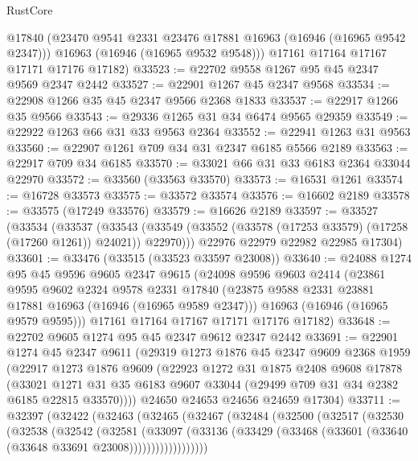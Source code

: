 \begin{lexlean}{RustCore}
\begin{coremodule}
        @17840
        (@23470 @9541 @2331 @23476 @17881 @16963 (@16946 (@16965 @9542 @2347)))
        @16963
        (@16946 (@16965 @9532 @9548)))
      @17161
      @17164
      @17167
      @17171
      @17176
      @17182)
@33523 := @22702 @9558 @1267 @95 @45 @2347 @9569 @2347 @2442
@33527 := @22901 @1267 @45 @2347 @9568
@33534 := @22908 @1266 @35 @45 @2347 @9566 @2368 @1833
@33537 := @22917 @1266 @35 @9566
@33543 := @29336 @1265 @31 @34 @6474 @9565 @29359
@33549 := @22922 @1263 @66 @31 @33 @9563 @2364
@33552 := @22941 @1263 @31 @9563
@33560 := @22907 @1261 @709 @34 @31 @2347 @6185 @5566 @2189
@33563 := @22917 @709 @34 @6185
@33570 := @33021 @66 @31 @33 @6183 @2364 @33044 @22970
@33572 := @33560 (@33563 @33570)
@33573 := @16531 @1261
@33574 := @16728 @33573
@33575 := @33572 @33574
@33576 := @16602 @2189
@33578 := @33575 (@17249 @33576)
@33579 := @16626 @2189
@33597 := @33527
    (@33534
      (@33537
        (@33543 (@33549 (@33552 (@33578 (@17253 @33579) (@17258 (@17260 @1261)) @24021)) @22970)))
      @22976
      @22979
      @22982
      @22985
      @17304)
@33601 := @33476 (@33515 (@33523 @33597 @23008))
@33640 := @24088
    @1274
    @95
    @45
    @9596
    @9605
    @2347
    @9615
    (@24098
      @9596
      @9603
      @2414
      (@23861
        @9595
        @9602
        @2324
        @9578
        @2331
        @17840
        (@23875 @9588 @2331 @23881 @17881 @16963 (@16946 (@16965 @9589 @2347)))
        @16963
        (@16946 (@16965 @9579 @9595)))
      @17161
      @17164
      @17167
      @17171
      @17176
      @17182)
@33648 := @22702 @9605 @1274 @95 @45 @2347 @9612 @2347 @2442
@33691 := @22901
    @1274
    @45
    @2347
    @9611
    (@29319
      @1273
      @1876
      @45
      @2347
      @9609
      @2368
      @1959
      (@22917
        @1273
        @1876
        @9609
        (@22923
          @1272
          @31
          @1875
          @2408
          @9608
          @17878
          (@33021
            @1271
            @31
            @35
            @6183
            @9607
            @33044
            (@29499 @709 @31 @34 @2382 @6185 @22815 @33570))))
      @24650
      @24653
      @24656
      @24659
      @17304)
@33711 := @32397
    (@32422
      (@32463
        (@32465
          (@32467
            (@32484
              (@32500
                (@32517
                  (@32530
                    (@32538
                      (@32542
                        (@32581
                          (@33097
                            (@33136
                              (@33429
                                (@33468 (@33601 (@33640 (@33648 @33691 @23008))))))))))))))))))

\end{coremodule}
\end{lexlean}
